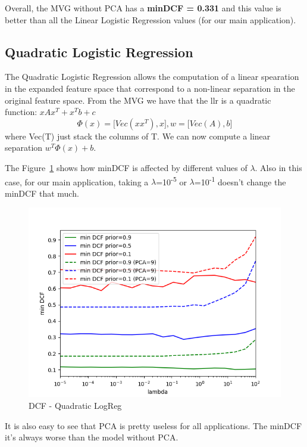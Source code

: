 \documentclass[english]{report}
\begin{document}
Overall, the MVG without PCA has a \textbf{minDCF = 0.331} and this value is better than all
the Linear Logistic Regression values (for our main application).

\clearpage

\subsection{Quadratic Logistic Regression}

The Quadratic Logistic Regression allows the computation of a linear spearation in the expanded feature
space that correspond to a non-linear separation in the original feature space.
From the MVG we have that the llr is a quadratic function: \(xAx^T + x^Tb + c\)
\[\Phi(x) = \bigg[Vec(xx^T), x\bigg], w = \bigg[Vec(A), b\bigg]\]
where Vec(T) just stack the columns of T. We can now compute a linear separation     
\(w^T\Phi(x) + b\). \newline

The Figure~\ref{fig:DCF_QuadLogReg_valid} shows how minDCF is affected by different values of $\lambda$.
Also in this case, for our main application, taking a $\lambda$=10\textsuperscript{-5} or $\lambda$=10\textsuperscript{-1}
doesn't change the minDCF that much.

\begin{figure}[H]
    \centering
    \includegraphics[scale=0.5]{../../images/validation/QUAD_LR_PCA_minDCF_comparison}
    \caption{DCF - Quadratic LogReg}
    \label{fig:DCF_QuadLogReg_valid}
\end{figure}

It is also easy to see that PCA is pretty useless for all applications.
The minDCF it's always worse than the model without PCA\@.
\end{document}
